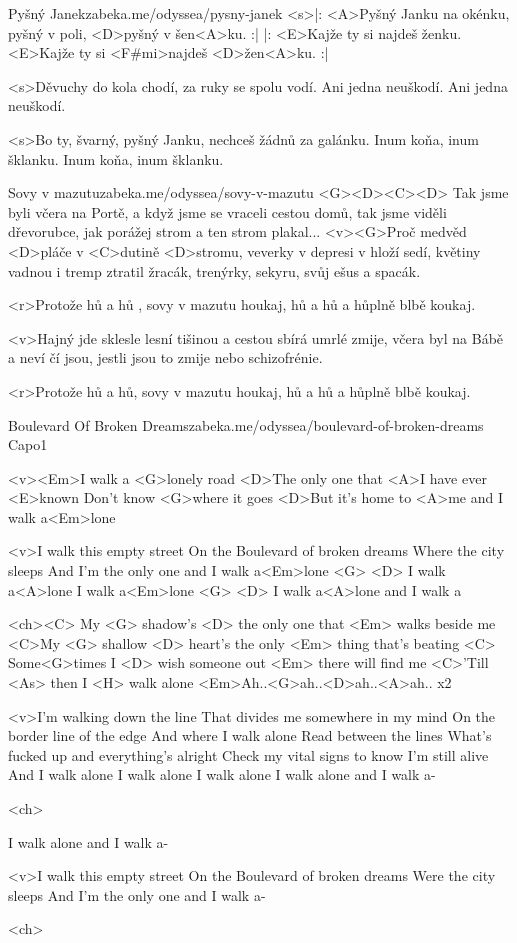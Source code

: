 \begin{song}{20}{Pyšný Janek}{zabeka.me/odyssea/pysny-janek}
<s>|: <A>Pyšný Janku na okénku,
pyšný v poli, <D>pyšný v šen<A>ku. :|
|: <E>Kajže ty si najdeš ženku.
<E>Kajže ty si <F#mi>najdeš <D>žen<A>ku. :|

<s>Děvuchy do kola chodí, za ruky se spolu vodí.
Ani jedna neuškodí. Ani jedna neuškodí.

<s>Bo ty, švarný, pyšný Janku, nechceš žádnů za galánku.
Inum koňa, inum šklanku. Inum koňa, inum šklanku. 

\end{song}
\begin{song}{21}{Sovy v mazutu}{zabeka.me/odyssea/sovy-v-mazutu}
<G><D><C><D>
Tak jsme byli včera na Portě, a když jsme se vraceli cestou domů, 
tak jsme viděli dřevorubce, jak porážej strom a ten strom plakal... 
<v><G>Proč medvěd <D>pláče v <C>dutině <D>stromu, veverky v depresi v hloží sedí, 
květiny vadnou i tremp ztratil žracák, trenýrky, sekyru, svůj ešus a spacák. 

<r>Protože hů a hů , sovy v mazutu houkaj, 
hů a hů a hůplně blbě koukaj. 

<v>Hajný jde sklesle lesní tišinou a cestou sbírá umrlé zmije, 
včera byl na Bábě a neví čí jsou, jestli jsou to zmije nebo schizofrénie. 

<r>Protože hů a hů, sovy v mazutu houkaj, 
hů a hů a hůplně blbě koukaj. 
\end{song}
\begin{song}{22}{Boulevard Of Broken Dreams}{zabeka.me/odyssea/boulevard-of-broken-dreams}
Capo1

<v><Em>I walk a <G>lonely road 
<D>The only one that <A>I have ever <E>known 
Don't know <G>where it goes 
<D>But it's home to <A>me and I walk a<Em>lone 

<v>I walk this empty street 
On the Boulevard of broken dreams 
Where the city sleeps 
And I'm the only one and I walk a<Em>lone <G>
<D> I walk a<A>lone I walk a<Em>lone <G>
<D> I walk a<A>lone and I walk a

<ch><C> My <G> shadow's <D> the only one that <Em> walks beside me 
<C>My <G> shallow <D> heart's the only <Em> thing that's beating
<C> Some<G>times I <D> wish someone out <Em> there will find me
<C>'Till <As> then I <H> walk alone 
<Em>Ah..<G>ah..<D>ah..<A>ah.. x2

<v>I'm walking down the line
That divides me somewhere in my mind 
On the border line of the edge 
And where I walk alone 
Read between the lines
What's fucked up and everything's alright 
Check my vital signs to know I'm still alive 
And I walk alone
I walk alone I walk alone
I walk alone and I walk a-

<ch>

I walk alone and I walk a-

<v>I walk this empty street 
On the Boulevard of broken dreams 
Were the city sleeps 
And I'm the only one and I walk a-

<ch>

\end{song}

